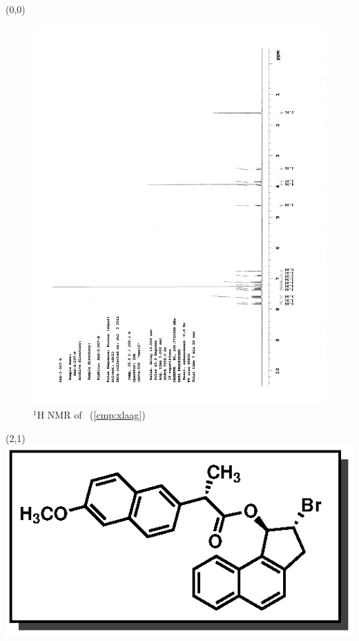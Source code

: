 \begin{textblock}{20}(0,0)
\begin{figure}[htb]
\caption{$^1$H NMR of \CMPxlaag\ (\ref{cmp:xlaag})}
\includegraphics[scale=0.75, trim = 0mm 0mm 0mm 5mm,
clip]{chp_asymmetric/images/nmr/xlaagH}
\vspace{-100pt}
\end{figure}
\end{textblock}
\begin{textblock}{1}(2,1)
\includegraphics[scale=0.8, angle=90]{chp_asymmetric/images/xlaag}
\end{textblock}
